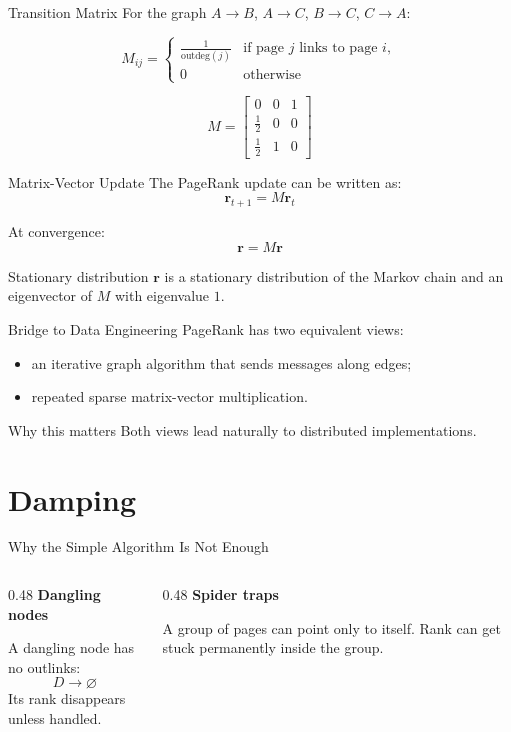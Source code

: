 \documentclass[aspectratio=169,11pt]{beamer}
\newcommand{\outdeg}{\mathrm{outdeg}}
\newcommand{\rankvec}{\mathbf{r}}
\begin{document}
\begin{frame}{Transition Matrix}
For the graph \(A \rightarrow B\), \(A \rightarrow C\), \(B \rightarrow C\),
\(C \rightarrow A\):

\[
M_{ij} =
\begin{cases}
\frac{1}{\outdeg(j)} & \text{if page } j \text{ links to page } i,\\
0 & \text{otherwise}
\end{cases}
\]

\[
M =
\begin{bmatrix}
0 & 0 & 1 \\
\frac{1}{2} & 0 & 0 \\
\frac{1}{2} & 1 & 0
\end{bmatrix}
\]
\end{frame}

\begin{frame}{Matrix-Vector Update}
The PageRank update can be written as:
\[
\rankvec_{t+1}=M\rankvec_t
\]

At convergence:
\[
\rankvec = M\rankvec
\]

\begin{block}{Stationary distribution}
\(\rankvec\) is a stationary distribution of the Markov chain and an eigenvector
of \(M\) with eigenvalue \(1\).
\end{block}
\end{frame}

\begin{frame}{Bridge to Data Engineering}
PageRank has two equivalent views:
\begin{itemize}
  \item an iterative graph algorithm that sends messages along edges;
  \item repeated sparse matrix-vector multiplication.
\end{itemize}

\begin{block}{Why this matters}
Both views lead naturally to distributed implementations.
\end{block}
\end{frame}

\section{Damping}

\begin{frame}{Why the Simple Algorithm Is Not Enough}
\begin{columns}[T,onlytextwidth]
\begin{column}{0.48\textwidth}
\textbf{Dangling nodes}

A dangling node has no outlinks:
\[
D \rightarrow \varnothing
\]
Its rank disappears unless handled.
\end{column}
\begin{column}{0.48\textwidth}
\textbf{Spider traps}

A group of pages can point only to itself. Rank can get stuck permanently inside
the group.
\end{column}
\end{columns}
\end{frame}
\end{document}
